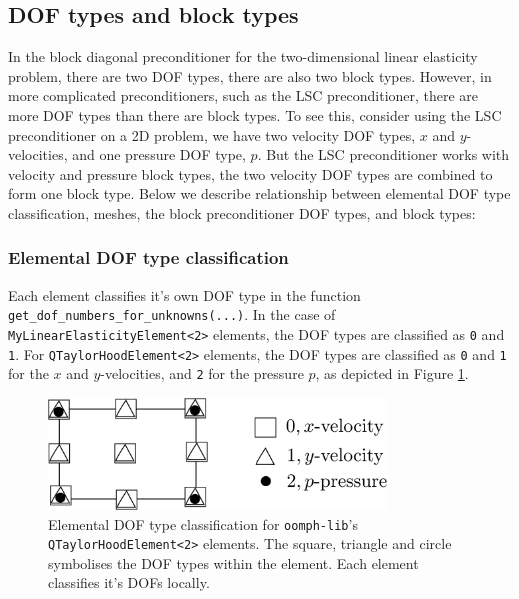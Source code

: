 \subsection{DOF types and block types\label{sec:dof_types_and_block_types}}
In the block diagonal preconditioner for the two-dimensional linear elasticity 
problem, there are two DOF types, there are also two block types. However, in 
more complicated preconditioners, such as the LSC preconditioner, there are 
more DOF types than there are block types. To see this, consider  using the 
LSC preconditioner on a 2D problem, we have two velocity DOF types, $x$ and 
$y$-velocities, and one pressure DOF type, $p$. But the LSC preconditioner 
works with velocity and pressure block types, the two velocity DOF types are 
combined to form one block type. Below we describe relationship between 
elemental DOF type classification, meshes, the block preconditioner DOF types, 
and block types:


\subsubsection{Elemental DOF type classification}

Each element classifies it's own DOF type in the function 
\texttt{get\_\allowbreak dof\_\allowbreak numbers\_\allowbreak for\_\allowbreak unknowns(...)}. In the case of 
\texttt{My\allowbreak Linear\allowbreak Elasticity\allowbreak Element<2>} elements, the DOF types are classified as 
\texttt{0} and \texttt{1}. For \texttt{Q\allowbreak TaylorHood\allowbreak Element<2>} 
elements, the DOF types are classified as \texttt{0} and \texttt{1} for the $x$
and $y$-velocities, and \texttt{2} for the pressure $p$, as depicted in Figure \ref{fig:2DTH_DOF_classification}.
\begin{figure}[H]
\centering
\includegraphics[width=0.8\textwidth]{./pic/taylorhood_dof_classification.pdf}
\caption{Elemental DOF type classification for \texttt{oomph-\allowbreak lib}'s
  \texttt{Q\allowbreak TaylorHood\allowbreak Element<2>} elements. The square,
  triangle and circle symbolises the DOF types within the element. Each element
  classifies it's DOFs locally.}
\label{fig:2DTH_DOF_classification}
\end{figure}

